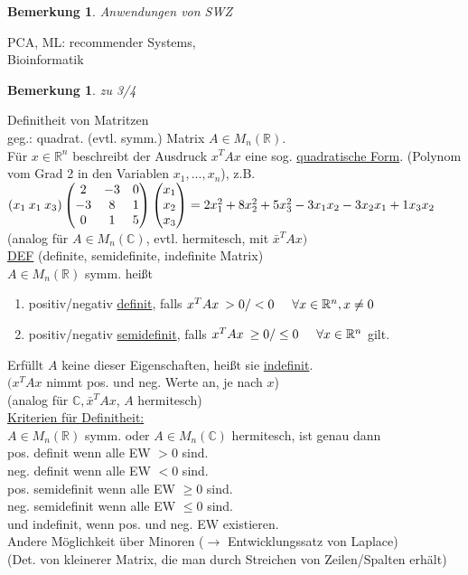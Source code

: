 \documentclass[a4paper,11pt]{article}
\newtheorem{bem}[definition]{Bemerkung}
\newcommand{\hsp}{\hspace{5mm}}
\begin{document}
\begin{bem}
	Anwendungen von SWZ
\end{bem}
PCA, ML: recommender Systems, \\
Bioinformatik

\begin{bem}
	 zu 3/4
\end{bem}
Definitheit von Matritzen \\
geg.: quadrat. (evtl. symm.) Matrix $A\in M_n(\mathbb{R})$. \\
Für $x\in\mathbb{R}^n$ beschreibt der Ausdruck $x^TAx$ eine sog.  \underline{quadratische Form}. (Polynom vom Grad 2 in den Variablen  $x_1,...,x_n$), z.B. $(x_1\:x_1\:x_3)\begin{pmatrix}2&-3&0\\-3&8&1\\0&1&5\end{pmatrix}\begin{pmatrix}x_1\\x_2\\x_3\end{pmatrix}= \\
2x_1^2+8x_2^2+5x_3^2-3x_1x_2-3x_2x_1+1x_3x_2$ \\
(analog für $A\in M_n(\mathbb{C})$, evtl. hermitesch, mit $\bar x^TAx)$ \\
\underline{DEF} (definite, semidefinite, indefinite Matrix) \\
$A\in M_n(\mathbb{R})$ symm. heißt
\begin{enumerate}[label=\alph*)]
	\item positiv/negativ \underline{definit}, falls $x^TAx\:>0/<0\hsp\forall x\in\mathbb{R}^n,x\neq0$
	\item positiv/negativ \underline{semidefinit}, falls $x^TAx\:\geq0/\leq0\hsp\forall x\in\mathbb{R}^n$ gilt.
\end{enumerate}
Erfüllt $A$ keine dieser Eigenschaften, heißt sie \underline{indefinit}. \\
$(x^TAx$ nimmt pos. und neg. Werte an, je nach $x$) \\ 
(analog für $\mathbb{C},\bar x^TAx$, $A$ hermitesch) \\
\underline{Kriterien für Definitheit:} \\
$A\in M_n(\mathbb{R})$ symm. oder $A\in M_n(\mathbb{C})$ hermitesch, ist genau dann \\
pos. definit wenn alle EW $> 0$ sind. \\
neg. definit wenn alle EW $< 0$ sind. \\
pos. semidefinit wenn alle EW $\geq 0$ sind. \\
neg. semidefinit wenn alle EW $\leq 0$ sind. \\
und indefinit, wenn pos. und neg. EW existieren. \\
Andere Möglichkeit über Minoren ($\rightarrow$ Entwicklungssatz von Laplace) \\
(Det. von kleinerer Matrix, die man durch Streichen von Zeilen/Spalten erhält)
\end{document}
